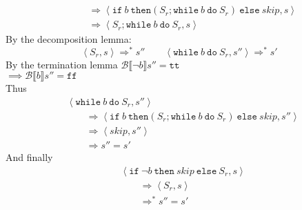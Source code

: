 \begin{exercise}
\begin{itemize}
\begin{itemize}
\begin{align*}
                    \\&\qquad\Rightarrow \left<\texttt{if}\ b\ \texttt{then} (S_r; \texttt{while}\ b\ \texttt{do}\ S_r)\ \texttt{else}\ skip, s\right>
                    \\&\qquad\Rightarrow \left<S_r; \texttt{while}\ b\ \texttt{do}\ S_r, s\right>
                \end{align*}
                By the decomposition lemma:
                \[ \left<S_r, s\right> \Rightarrow^* s'' \qquad \left<\texttt{while}\ b\ \texttt{do}\ S_r, s''\right> \Rightarrow^* s' \]
                By the termination lemma $\mathcal{B} \llbracket \neg b \rrbracket s'' = \texttt{tt}$ \\
                $\implies \mathcal{B} \llbracket b \rrbracket s'' = \texttt{ff}$ \\
                Thus
                \begin{align*}
                    &\left<\texttt{while}\ b\ \texttt{do}\ S_r, s''\right>
                    \\&\qquad\Rightarrow \left<\texttt{if}\ b\ \texttt{then} (S_r; \texttt{while}\ b\ \texttt{do}\ S_r)\ \texttt{else}\ skip, s''\right>
                    \\&\qquad\Rightarrow \left<skip, s''\right>
                    \\&\qquad\Rightarrow s'' = s'
                \end{align*}
                And finally
                \begin{align*}
                    &\left<\texttt{if}\ \neg b\ \texttt{then}\ skip\ \texttt{else}\ S_r, s\right>
                    \\&\qquad\Rightarrow \left<S_r, s\right>
                    \\&\qquad\Rightarrow^* s'' = s'
                \end{align*}
            \end{itemize}
    \end{itemize}
\end{exercise}
